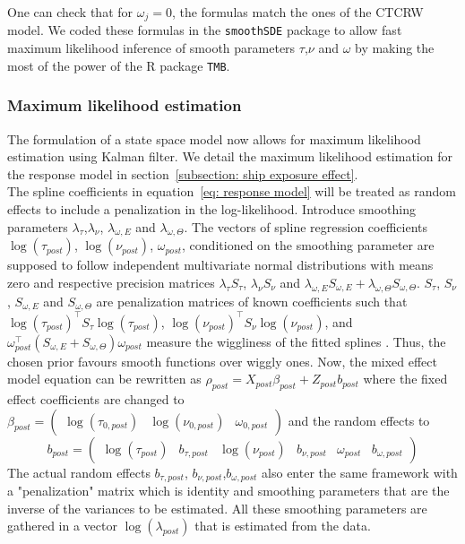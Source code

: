 \documentclass[11pt]{article}
\newcommand {\1}{\mathbb{1}}
\begin{document}
One can check that for $\omega_j=0$, the formulas match the ones of the CTCRW model.
We coded these formulas in the \texttt{smoothSDE} package to allow fast maximum likelihood inference of smooth parameters $\tau$,$\nu$ and $\omega$ by making the most of the power of the R package \texttt{TMB}. 


\subsubsection{Maximum likelihood estimation}
The formulation of a state space model now allows for maximum likelihood estimation using Kalman filter.
We detail the maximum likelihood estimation for the response model in section~\ref{subsection: ship exposure effect}. \\

The spline coefficients in equation~\ref{eq: response model} will be treated as random effects to include a penalization in the log-likelihood. 
Introduce smoothing parameters $\lambda_{\tau}$,$\lambda_{\nu}$, $\lambda_{\omega,E}$ and $\lambda_{\omega,\Theta}$. The vectors of spline regression coefficients $\log(\tau_{post})$, $\log(\nu_{post})$, $\omega_{post}$,  conditioned on the smoothing parameter are supposed to follow independent multivariate normal distributions with means zero and respective precision matrices $\lambda_{\tau}S_{\tau}$, $\lambda_{\nu}S_{\nu}$ and $\lambda_{\omega,E}S_{\omega,E}+\lambda_{\omega,\Theta}S_{\omega,\Theta}$. $S_{\tau}$, $S_{\nu}$, $S_{\omega,E}$ and $S_{\omega,\Theta}$ are penalization matrices of known coefficients such that 
$\log(\tau_{post})^\top S_{\tau}\log(\tau_{post})$, $\log(\nu_{post})^\top S_{\nu}\log(\nu_{post})$, and $\omega_{post}^\top (S_{\omega,E}+S_{\omega,\Theta})\omega_{post}$ measure the wiggliness of the fitted splines \cite{michelot_varying-coefficient_2021,wood_generalized_2017}. Thus, the chosen prior favours smooth functions over wiggly ones. Now, the mixed effect model equation can be rewritten as $\rho_{post}=X_{post}\beta_{post}+Z_{post} b_{post}$ where the fixed effect coefficients are changed to $\beta_{post}=\begin{pmatrix} \log(\tau_{0,post}) & \log(\nu_{0,post}) & \omega_{0,post} \end{pmatrix} $ and the random effects to 
\[b_{post}=\begin{pmatrix} \log(\tau_{post}) & b_{\tau,post} & \log(\nu_{post}) & b_{\nu,post} & \omega_{post} & b_{\omega,post}\end{pmatrix}\]
The actual random effects $b_{\tau,post}$, $b_{\nu,post}$,$b_{\omega,post}$ also enter the same framework with a "penalization" matrix which is identity and smoothing parameters that are the inverse of the variances to be estimated.
All these smoothing parameters are gathered in a vector $\log(\lambda_{post})$ that is estimated from the data.
\\
\end{document}
